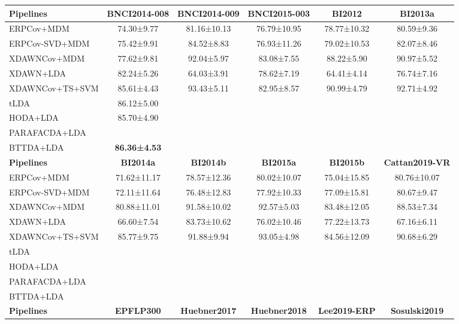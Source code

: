 \begin{tabularx}{\textwidth}{@{}Xccccc@{}}
\toprule
\textbf{Pipelines}            & \textbf{BNCI2014-008} & \textbf{BNCI2014-009}
                              & \textbf{BNCI2015-003} & \textbf{BI2012} &
                              \textbf{BI2013a}\\
\midrule
ERPCov+MDM            & 74.30±9.77 & 81.16±10.13 & 76.79±10.95 & 78.77±10.32 & 80.59±9.36 \\
ERPCov-SVD+MDM  & 75.42±9.91 & 84.52±8.83 & 76.93±11.26 & 79.02±10.53 & 82.07±8.46 \\
XDAWNCov+MDM          & 77.62±9.81 & 92.04±5.97 & 83.08±7.55 & 88.22±5.90 & 90.97±5.52 \\
XDAWN+LDA             & 82.24±5.26 & 64.03±3.91 & 78.62±7.19 & 64.41±4.14 & 76.74±7.16 \\
XDAWNCov+TS+SVM       & 85.61±4.43 & 93.43±5.11 & 82.95±8.57 & 90.99±4.79 & 92.71±4.92\\
tLDA                  & 86.12±5.00 & & & & \\ \midrule
HODA+LDA                  & 85.70±4.90 & & & &  \\
PARAFACDA+LDA             & & & & &  \\
BTTDA+LDA                 & \textbf{86.36±4.53}& & & &  \\
\toprule
\textbf{Pipelines} & \textbf{BI2014a} & \textbf{BI2014b} & \textbf{BI2015a} &
\textbf{BI2015b} & \textbf{Cattan2019-VR}\\
\midrule
ERPCov+MDM            & 71.62±11.17 & 78.57±12.36 & 80.02±10.07 & 75.04±15.85 & 80.76±10.07 \\
ERPCov-SVD+MDM  & 72.11±11.64 & 76.48±12.83 & 77.92±10.33 & 77.09±15.81 & 80.67±9.47 \\
XDAWNCov+MDM          & 80.88±11.01 & 91.58±10.02 & 92.57±5.03 & 83.48±12.05 & 88.53±7.34 \\
XDAWN+LDA             & 66.60±7.54 & 83.73±10.62 & 76.02±10.46 & 77.22±13.73 & 67.16±6.11 \\
XDAWNCov+TS+SVM       & 85.77±9.75 & 91.88±9.94 & 93.05±4.98 & 84.56±12.09 &90.68±6.29 \\
tLDA                  & & & & & \\ \midrule
HODA+LDA                  & & & & &  \\
PARAFACDA+LDA             & & & & &  \\
BTTDA+LDA                 & & & & &  \\
\toprule
\textbf{Pipelines} &  \textbf{EPFLP300} & \textbf{Huebner2017} &
\textbf{Huebner2018} & \textbf{Lee2019-ERP} & \textbf{Sosulski2019} \\

\end{tabularx}

